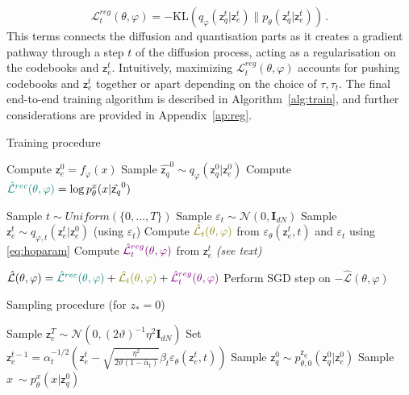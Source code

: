 \documentclass{article}
\theoremstyle{plain}
\theoremstyle{definition}
\theoremstyle{remark}
\newcommand{\latentcont}{\mathsf{z}_e}
\newcommand{\latentdis}{\mathsf{z}_q}
\begin{document}
\begin{equation}
    \mathcal{L}^{reg}_t(\theta,\varphi) = -\mathrm{KL}(q_\varphi(\latentdis^{t}|\latentcont^{t})\|p_\theta(\latentdis^{t}|\latentcont^{t}))\,. 
\end{equation}
This terms connects the diffusion and quantisation parts as it creates a gradient pathway through a step $t$ of the diffusion process, acting as a regularisation on the codebooks and $\latentcont^t$. Intuitively, maximizing $\mathcal{L}^{reg}_t(\theta,\varphi)$  accounts for pushing codebooks and $\latentcont^t$ together or apart depending on the choice of $\tau, \tau_t$. The final end-to-end training algorithm is described in Algorithm~\ref{alg:train}, and further considerations are provided  in Appendix~\ref{ap:reg}.


\begin{algorithm}[tb]
   \caption{Training procedure}
   \label{alg:train}
\begin{algorithmic}
   \REPEAT
   

   \STATE Compute $\latentcont^0= f_\varphi(x)$ 
   \STATE Sample $\hat{\latentdis}^0 \sim q_\varphi(\latentdis^0|\latentcont^0)$
   \STATE Compute $\textcolor{teal}{\hat{\mathcal{L}}^{rec}(\theta,\varphi)} = \log p^x_{\theta}(x|\hat{\latentdis}^0)$ 

   \STATE Sample $t \sim Uniform(\{0,\ldots, T\})$ 
   \STATE Sample $\varepsilon_t \sim \mathcal{N}(0,\mathbf{I}_{dN})$
   \STATE Sample $\latentcont^{t} \sim q_{\varphi,t}(\latentcont^t|\latentcont^0)$ (using $\varepsilon_t$)
   \STATE Compute $\textcolor{olive}{\hat{\mathcal{L}}_t(\theta,\varphi)}$ from $\varepsilon_\theta(\latentcont^{t},t)$ and $\varepsilon_t$ using \eqref{eq:hoparam}
   \STATE Compute $\textcolor{violet}{\hat{\mathcal{L}}^{reg}_t(\theta,\varphi)}$ from $\latentcont^{t}$ \textit{(see text)}

   \STATE $\hat{\mathcal{L}}(\theta,\varphi) = \textcolor{teal}{\hat{\mathcal{L}}^{rec}(\theta,\varphi)} + \textcolor{olive}{\hat{\mathcal{L}}_t(\theta,\varphi)} + \textcolor{violet}{\hat{\mathcal{L}}^{reg}_t(\theta,\varphi)}$
   \STATE Perform SGD step on $-\hat{\mathcal{L}}(\theta,\varphi)$
\end{algorithmic}
\end{algorithm}

\begin{algorithm}[tb]
   \caption{Sampling procedure (for $z_* = 0$)}
   \label{alg:sample}
\begin{algorithmic}
   
   \STATE Sample $\latentcont^T \sim \mathcal{N}(0, (2\vartheta)^{-1}\eta^2 \mathbf{I}_{dN})$ 
   \STATE Set $\latentcont^{t-1} = \alpha_t^{-1/2}\left(\latentcont^t - \sqrt{\frac{\eta^2}{2\vartheta (1-\bar{\alpha}_t)}}\beta_t\varepsilon_\theta(\latentcont^{t},t)\right)$
   \ENDFOR
   \STATE  Sample $\latentdis^0 \sim  p^{\latentdis}_{\theta,0}(\latentdis^0|\latentcont^0)$ 
   \STATE Sample $x ~ \sim  p^x_{\theta}(x|\latentdis^0)$ 
\end{algorithmic}
\end{algorithm}
\end{document}

